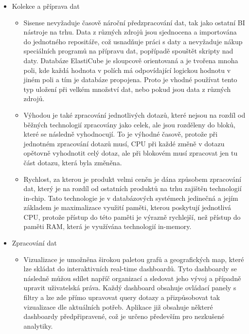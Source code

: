 \documentclass[czech,BP]{thesiskiv2}
\begin{document}
 \begin{itemize}
 	\item Kolekce a příprava dat
 	\begin{itemize}
 		\item Sisense nevyžaduje časově nároční předzpracování dat, tak jako ostatní BI nástroje na trhu. Data z různých zdrojů jsou sjednocena a importována do jednotného repositáře, což usnadňuje práci s daty a nevyžaduje nákup speciálních programů na přípravu dat, popřípadě spouštět skripty nad daty. Databáze ElastiCube je sloupcově orientovaná a je tvořena mnoha poli, kde každá hodnota v polích má odpovídající logickou hodnotu v jiném poli a tím je databáze propojena. Proto je vhodné používat tento typ uložení při velkém množství dat, nebo pokud jsou data z různých zdrojů.
 		
 		\item Výhodou je také zpracování jednotlivých dotazů, které nejsou na rozdíl od běžných technologií zpracovány jako celek, ale jsou rozděleny do bloků, které se následně vyhodnocují. To je výhodné časově, protože při jednotném zpracování dotazů musí, CPU při každé změně v dotazu opětovně vyhodnotit celý dotaz, ale při blokovém musí zpracovat jen tu část dotazu, která byla změněna.\cite{ElasticCube}
 		
 		\item Rychlost, za kterou je produkt velmi ceněn je dána způsobem zpracování dat, který je na rozdíl od ostatních produktů na trhu zajištěn technologií in-chip. Tato technologie je v databázových systémech jedinečná a jejím základem je maximalizace využití paměti, kterou poskytují jednotlivá CPU, protože přístup do této paměti je výrazně rychlejší, než přístup do paměti RAM, která je využívána technologií in-memory.
 		
 	\end{itemize}
 	\item Zpracování dat
 	\begin{itemize}
 		\item Vizualizace je umožněna širokou paletou grafů a geografických map, které lze skládat do interaktivních real-time dashboardů. Tyto dashboardy se následně můžou sdílet napříč organizací a sledovat jeho vývoj a případně upravit uživatelská práva. Každý dashboard obsahuje ovládací panely s filtry a lze zde přímo upravovat query dotazy a přizpůsobovat tak vizualizace dle aktuálních potřeb. Aplikace již obsahuje některé dashboardy předpřipravené, což je určeno především pro nezkušené analytiky.\cite{SisenseVizualize}

 	\end{itemize}
 \end{itemize}
 
\end{document}
